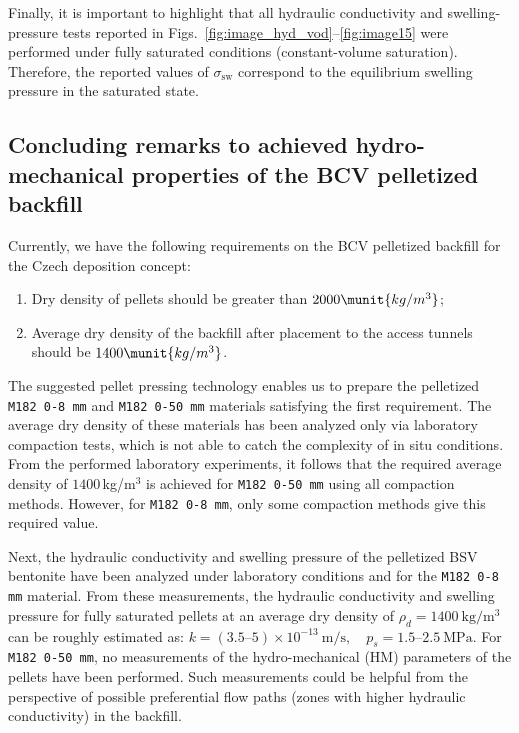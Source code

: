 Finally, it is important to highlight that all hydraulic conductivity and swelling-pressure tests reported in Figs.~\ref{fig:image_hyd_vod}–\ref{fig:image15} were performed under fully saturated conditions (constant-volume saturation). Therefore, the reported values of 
$\sigma_{\text{sw}}$ correspond to the equilibrium swelling pressure in the 
saturated state.


\subsection{Concluding remarks to achieved hydro-mechanical properties of the BCV pelletized backfill}

Currently, we have the following requirements on the \acrshort{BCV} pelletized backfill for the Czech deposition concept: 
\begin{enumerate}
    \item Dry density of pellets should be greater than $2000 \munit{kg/m^3}$;
    \item Average dry density of the backfill after placement to the access tunnels\\ should be $1400 \munit{kg/m^3}$.
\end{enumerate}
The suggested pellet pressing technology enables us to prepare the pelletized \texttt{M182 0-8 mm} and \texttt{M182 0-50 mm} materials satisfying the first requirement. The average dry density of these materials has been analyzed only via laboratory compaction tests, which is not able to catch the complexity of in situ conditions. From the performed laboratory experiments, it follows that the required average density of $1400\,$kg/m$^3$ is achieved for \texttt{M182 0-50 mm} using all compaction methods. However, for \texttt{M182 0-8 mm}, only some compaction methods give this required value.

Next, the hydraulic conductivity and swelling pressure of the pelletized BSV bentonite have been analyzed under laboratory conditions and for the \texttt{M182 0-8 mm} material. 
From these measurements, the hydraulic conductivity and swelling pressure for fully saturated pellets at an average dry density of 
$\rho_d = 1400 \ \mathrm{kg/m^3}$
can be roughly estimated as:
$k = (3.5\text{–}5) \times 10^{-13} \ \mathrm{m/s}, \quad p_s = 1.5\text{–}2.5 \ \mathrm{MPa}$.
For \texttt{M182 0-50 mm}, no measurements of the hydro-mechanical (HM) parameters of the pellets have been performed. Such measurements could be helpful from the perspective of possible preferential flow paths (zones with higher hydraulic conductivity) in the backfill. 


